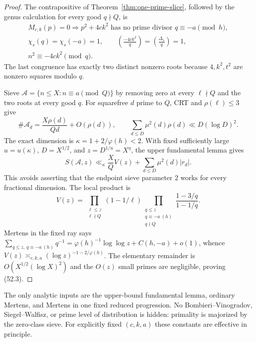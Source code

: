 \documentclass[10pt,reqno]{amsart}
\theoremstyle{definition}
\newcommand{\1}{\mathbf 1}
\begin{document}
\begin{proof}
The contrapositive of Theorem~\ref{thm:one-prime-slice}, followed by the
genus calculation for every good $q\nmid Q$, is
\begin{equation}\tag{52.4--52.7}
 \begin{gathered}
 M_{c,k}(p)=0\Longrightarrow
 p^2+4ck^2\text{ has no prime divisor }q\equiv-a\pmod h,\\
 \chi_s(q)=\chi_s(-a)=1,
 \qquad \left(\frac{-4ck^2}{q}\right)
 =\left(\frac{\Delta_s}{q}\right)=1,\\
                         n^2\equiv-4ck^2\pmod q.
 \end{gathered}
\end{equation}
The last congruence has exactly two distinct nonzero roots because
$4,k^2,t^2$ are nonzero squares modulo $q$.

Sieve $\mathcal A=\{n\leq X:n\equiv a\pmod Q\}$ by removing zero at every
$\ell\nmid Q$ and the two roots at every good $q$.  For squarefree
$d$ prime to $Q$, CRT and $\rho(\ell)\leq3$ give
\begin{equation}\tag{52.8--52.10}
 \#\mathcal A_d=\frac{X\rho(d)}{Qd}+O(\rho(d)),\qquad
 \sum_{d\leq D}\mu^2(d)\rho(d)\ll D(\log D)^2.
\end{equation}
The exact dimension is $\kappa=1+2/\varphi(h)<2$.  With fixed sufficiently
large $u=u(\kappa)$, $D=X^{1/2}$, and $z=D^{1/u}=X^\eta$, the upper
fundamental lemma gives
\begin{equation}\tag{52.12}
 S(\mathcal A,z)\ll_\kappa\frac XQ V(z)
       +\sum_{d\leq D}\mu^2(d)|r_d|.
\end{equation}
This avoids asserting that the endpoint sieve parameter $2$ works for every
fractional dimension.  The local product is
\begin{equation}\tag{52.13}
 V(z)=\prod_{\substack{\ell\leq z\\\ell\nmid Q}}(1-1/\ell)
 \prod_{\substack{q\leq z\\q\equiv-a\ (h)\\q\nmid Q}}
       \frac{1-3/q}{1-1/q}.
\end{equation}
Mertens in the fixed ray says
$\sum_{q\leq z,\ q\equiv-a\ (h)}q^{-1}
=\varphi(h)^{-1}\log\log z+C(h,-a)+o(1)$, whence
$V(z)\asymp_{c,k,a}(\log z)^{-1-2/\varphi(h)}$.
The elementary remainder is $O(X^{1/2}(\log X)^2)$ and the $O(z)$ small
primes are negligible, proving (52.3).
\end{proof}
The only analytic inputs are the upper-bound fundamental lemma, ordinary
Mertens, and Mertens in one fixed reduced progression.  No
Bombieri--Vinogradov, Siegel--Walfisz, or prime level of distribution is
hidden: primality is majorized by the zero-class sieve.  For explicitly
fixed $(c,k,a)$ these constants are effective in principle.
\end{document}
